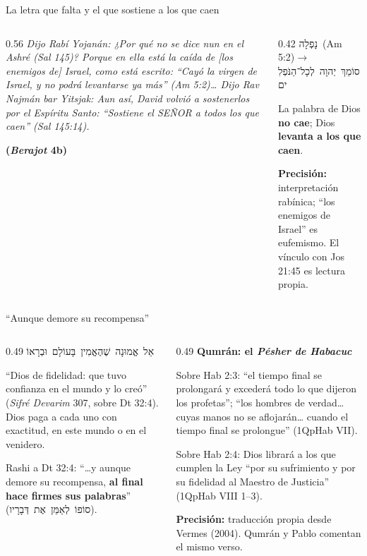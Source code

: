 \documentclass[hyperref={bookmarks=false},aspectratio=169]{beamer}
\let\raggedright\justifying
\newcommand{\heb}[1]{\mbox{\foreignlanguage{hebrew}{#1}}}
\newcommand{\SENOR}{S{\fontsize{0.78em}{1em}\selectfont EÑOR}}
\newcommand{\fuente}[1]{\par\hfill{\upshape\bfseries\footnotesize\textcolor{azul}{#1}}}
\newcommand{\destacar}[1]{\textbf{\textcolor{azul}{#1}}}
\newcommand{\precision}[1]{{\footnotesize\color{gris}\textbf{Precisión:} #1}}
\begin{document}
\begin{frame}{La letra que falta y el que sostiene a los que caen}
\begin{columns}[t,onlytextwidth]
\begin{column}{0.56\textwidth}\scriptsize\itshape
Dijo Rabí Yojanán: ¿Por qué no se dice \emph{nun} en el \emph{Ashré} (Sal 145)? Porque en ella está la caída de [los enemigos de] Israel, como está escrito: ``Cayó la virgen de Israel, y no podrá levantarse ya más'' (Am 5:2)\ldots{} Dijo Rav Najmán bar Yitsjak: Aun así, David volvió a sostenerlos por el Espíritu Santo: ``Sostiene el \SENOR{} a todos los que caen'' (Sal 145:14).\upshape\fuente{(\emph{Berajot} 4b)}
\end{column}
\begin{column}{0.42\textwidth}\small
\centering\heb{נָפְלָה}\ (Am 5:2)\quad$\rightarrow$\quad\heb{סוֹמֵךְ יְהוָה לְכָל־הַנֹּפְלִים}\par\medskip
\raggedright La palabra de Dios \destacar{no cae}; Dios \destacar{levanta a los que caen}.\par\smallskip
\precision{interpretación rabínica; ``los enemigos de Israel'' es eufemismo. El vínculo con Jos 21:45 es lectura propia.}
\end{column}
\end{columns}
\end{frame}

\begin{frame}{``Aunque demore su recompensa''}
\begin{columns}[t,onlytextwidth]
\begin{column}{0.49\textwidth}
\centering\heb{אֵל אֱמוּנָה שֶׁהֶאֱמִין בָּעוֹלָם וּבְרָאוֹ}\par\smallskip
\raggedright\scriptsize ``Dios de fidelidad: que tuvo confianza en el mundo y lo creó'' (\emph{Sifré Devarim} 307, sobre Dt 32:4). Dios paga a cada uno con exactitud, en este mundo o en el venidero.\par\medskip
\small Rashi a Dt 32:4: ``\ldots{}y aunque demore su recompensa, \destacar{al final hace firmes sus palabras}'' (\heb{סוֹפוֹ לְאַמֵּן אֶת דְּבָרָיו}).
\end{column}
\begin{column}{0.49\textwidth}
\textbf{\small\textcolor{azul}{Qumrán: el \emph{Pésher de Habacuc}}}\par\smallskip
\scriptsize Sobre Hab 2:3: ``el tiempo final se prolongará y excederá todo lo que dijeron los profetas''; ``los hombres de verdad\ldots{} cuyas manos no se aflojarán\ldots{} cuando el tiempo final se prolongue'' (1QpHab VII).\par\smallskip
Sobre Hab 2:4: Dios librará a los que cumplen la Ley ``por su sufrimiento y por su fidelidad al Maestro de Justicia'' (1QpHab VIII 1--3).\par\smallskip
\precision{traducción propia desde Vermes (2004). Qumrán y Pablo comentan el mismo verso.}
\end{column}
\end{columns}
\end{frame}
\end{document}

